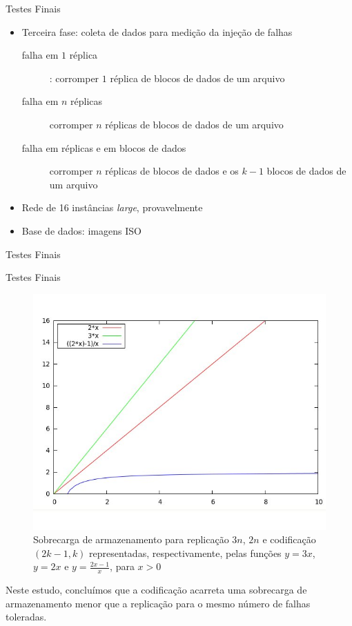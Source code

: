   \begin{frame}{Testes Finais}
     \begin{itemize}
        \item<1-> Terceira fase: coleta de dados para medição da injeção de falhas
           \begin{description}
              \item [falha em $1$ réplica]: corromper $1$ réplica de blocos de dados de um arquivo
              \item [falha em $n$ réplicas] corromper $n$ réplicas de blocos de dados de um arquivo
              \item [falha em réplicas e em blocos de dados] corromper $n$ réplicas de blocos de dados e os $k-1$ blocos de dados de um arquivo
            \end{description}
        \item<2-> Rede de 16 instâncias \emph{large}, provavelmente
        \item<3-> Base de dados: imagens ISO
     \end{itemize}
  \end{frame}

  \begin{frame}{Testes Finais}

     

  \end{frame}

  \begin{frame}{Testes Finais}
    \vspace*{2cm}
    \begin{figure}[h]
      \centering
      \includegraphics[scale=0.25]{gnuplot-replicacao-codificacao-3.jpg}
      \caption{Sobrecarga de armazenamento para replicação $3n$, $2n$ e codificação $(2k-1,k)$ representadas, respectivamente, pelas funções $y = 3x$, $y = 2x$ e $y = \frac{2x-1}{x}$, para $x>0$}
      \label{fig1:sarc}
    \end{figure}

Neste estudo, concluímos que a codificação acarreta uma sobrecarga de armazenamento menor que a replicação para o mesmo número de falhas toleradas.

  \end{frame}

